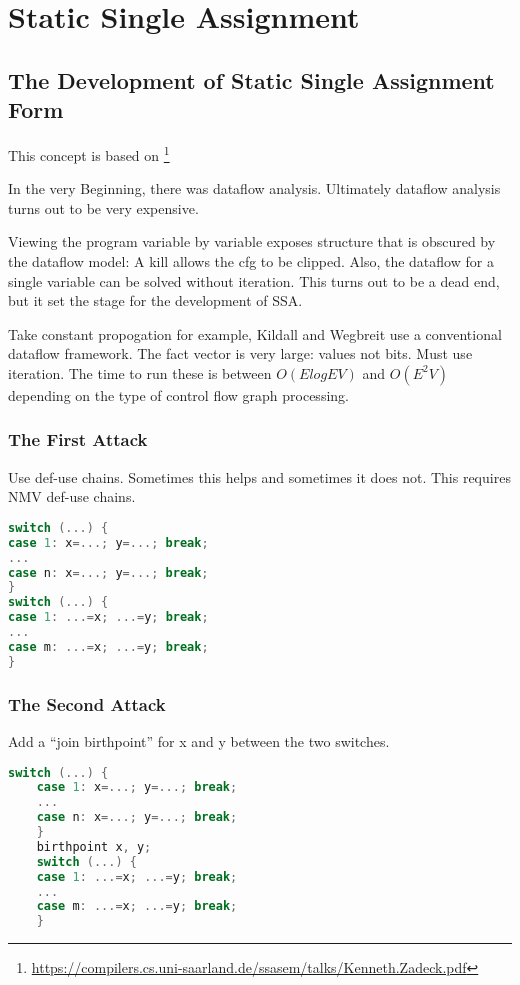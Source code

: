 \section{Static Single Assignment}

\subsection{The Development of Static Single Assignment Form}

This concept is based on \footnote{\url{https://compilers.cs.uni-saarland.de/ssasem/talks/Kenneth.Zadeck.pdf}}


In the very Beginning, there was dataflow analysis.   Ultimately dataflow analysis turns out to be very expensive.

Viewing the program variable by variable exposes structure that is obscured by the dataflow model: 
A kill allows the cfg to be clipped. Also, the dataflow for a single variable can be solved
without iteration. This turns out to be a dead end, but it set the
stage for the development of SSA.


Take constant propogation for example, Kildall and Wegbreit use a conventional
dataflow framework. The fact vector is very large: values not bits. Must use iteration.
The time to run these is between \(O(ElogEV)\) and
\(O(E^2 V)\) depending on the type of control flow
graph processing.



\subsubsection{The First Attack}


Use def-use chains. Sometimes this helps and sometimes it does not. This requires NMV
def-use chains.

\begin{lstlisting}[language=C,frame=single, caption=An ,label = lst:expr2]
switch (...) {
case 1: x=...; y=...; break;
...
case n: x=...; y=...; break;
}
switch (...) {
case 1: ...=x; ...=y; break;
...
case m: ...=x; ...=y; break;
}
\end{lstlisting}


\subsubsection{The Second Attack }


Add a “join birthpoint”
for x and y between
the two switches. 



\begin{lstlisting}[language=C,frame=single, caption=An ,label = lst:expr2]
    switch (...) {
    case 1: x=...; y=...; break;
    ...
    case n: x=...; y=...; break;
    }
    birthpoint x, y;
    switch (...) {
    case 1: ...=x; ...=y; break;
    ...
    case m: ...=x; ...=y; break;
    }
    \end{lstlisting}